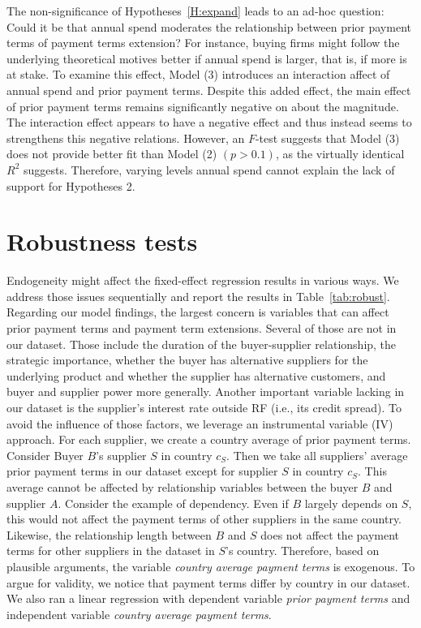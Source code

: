 \documentclass[A4,11pt]{article}
\renewcommand{\~}[1]{\tilde{#1}}
\renewcommand{\-}[1]{\overline{#1}}
\begin{document}
\FloatBarrier
The non-significance of Hypotheses~\ref{H:expand} leads to an ad-hoc question: Could it be that annual spend moderates the relationship between prior payment terms of payment terms extension? For instance, buying firms might follow the underlying theoretical motives better if annual spend is larger, that is, if more is at stake. To examine this effect, Model (3) introduces an interaction affect of annual spend and prior payment terms. Despite this added effect, the main effect of prior payment terms remains significantly negative on about the magnitude. The interaction effect appears to have a negative effect and thus instead seems to strengthens this negative relations. However, an $F$-test suggests that Model (3) does not provide better fit than Model (2) $(p>0.1)$, as the virtually identical $R^2$ suggests. Therefore, varying levels annual spend cannot explain the lack of support for Hypotheses 2.

\section{Robustness tests}\label{sec:robust}
Endogeneity might affect the fixed-effect regression results in various ways. We address those issues sequentially and report the results in Table~\ref{tab:robust}. Regarding our model findings, the largest concern is variables that can affect prior payment terms and payment term extensions. Several of those are not in our dataset. Those include the duration of the buyer-supplier relationship, the strategic importance, whether the buyer has alternative suppliers for the underlying product and whether the supplier has alternative customers, and buyer and supplier power more generally. Another important variable lacking in our dataset is the supplier's interest rate outside RF (i.e., its credit spread). To avoid the influence of those factors, we leverage an instrumental variable (IV) approach. For each supplier, we create a country average of prior payment terms. Consider Buyer $B$'s supplier $S$ in country $c_S$. Then we take all suppliers' average prior payment terms in our dataset except for supplier $S$ in country $c_S$. This average cannot be affected by relationship variables between the buyer $B$ and supplier $A$. Consider the example of dependency. Even if $B$ largely depends on $S$, this would not affect the payment terms of other suppliers in the same country. Likewise, the relationship length between $B$ and $S$ does not affect the payment terms for other suppliers in the dataset in $S$'s country. Therefore, based on plausible arguments, the variable \textit{country average payment terms} is exogenous. To argue for validity, we notice that payment terms differ by country in our dataset. We also ran a linear regression with dependent variable \textit{prior payment terms} and independent variable \textit{country average payment terms}.
\end{document}
